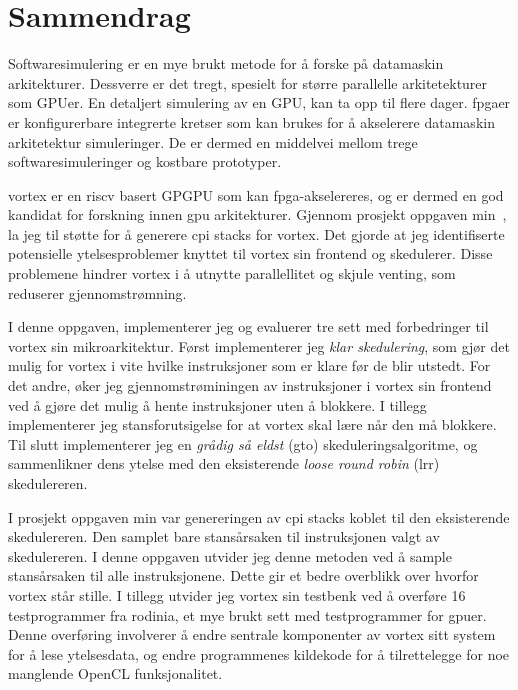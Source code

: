 \chapter*{Sammendrag}

Softwaresimulering er en mye brukt metode for å forske på datamaskin arkitekturer. Dessverre er det tregt, spesielt for større parallelle arkitetekturer som GPUer. En detaljert simulering av en GPU, kan ta opp til flere dager. \acrshort{fpga}er er konfigurerbare integrerte kretser som kan brukes for å akselerere datamaskin arkitetektur simuleringer. De er dermed en middelvei mellom trege softwaresimuleringer og kostbare prototyper.

\Gls{vortex} er en \Gls{riscv} basert GPGPU som kan \acrshort{fpga}-akselereres, og er dermed en god kandidat for forskning innen \acrshort{gpu} arkitekturer. Gjennom prosjekt oppgaven min~\cite{Aurud_Project}, la jeg til støtte for å generere \acrshort{cpi} stacks for \Gls{vortex}. Det gjorde at jeg identifiserte potensielle ytelsesproblemer knyttet til \Gls{vortex} sin frontend og skedulerer. Disse problemene hindrer \Gls{vortex} i å utnytte parallellitet og skjule venting, som reduserer gjennomstrømning.

I denne oppgaven, implementerer jeg og evaluerer tre sett med forbedringer til \Gls{vortex} sin mikroarkitektur. Først implementerer jeg \textit{klar skedulering}, som gjør det mulig for \Gls{vortex} i vite hvilke instruksjoner som er klare før de blir utstedt. For det andre, øker jeg gjennomstrøminingen av instruksjoner i \Gls{vortex} sin frontend ved å gjøre det mulig å hente instruksjoner uten å blokkere. I tillegg implementerer jeg stansforutsigelse for at \Gls{vortex} skal lære når den må blokkere. Til slutt implementerer jeg en \textit{grådig så eldst} (\acrshort{gto}) skeduleringsalgoritme, og sammenlikner dens ytelse med den eksisterende \textit{loose round robin} (\acrshort{lrr}) skedulereren.

I prosjekt oppgaven min var genereringen av \acrshort{cpi} stacks koblet til den eksisterende skedulereren. Den samplet bare stansårsaken til instruksjonen valgt av skedulereren. I denne oppgaven utvider jeg denne metoden ved å sample stansårsaken til alle instruksjonene. Dette gir et bedre overblikk over hvorfor \Gls{vortex} står stille. I tillegg utvider jeg \Gls{vortex} sin testbenk ved å overføre 16 testprogrammer fra \Gls{rodinia}, et mye brukt sett med testprogrammer for \acrshort{gpu}er. Denne overføring involverer å endre sentrale komponenter av \Gls{vortex} sitt system for å lese ytelsesdata, og endre programmenes kildekode for å tilrettelegge for noe manglende OpenCL funksjonalitet.

